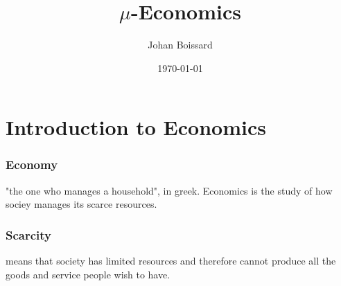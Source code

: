\documentclass[a4paper,titlepage] {scrartcl}
\author{Johan Boissard}
\date{\today}
\title{$\mu$-Economics}
\begin{document}
\maketitle

\section{Introduction to Economics}
\subsubsection{Economy} "the one who manages a household", in greek. Economics is the study of how sociey manages its scarce resources.

\subsubsection{Scarcity}
means that society has limited resources and therefore cannot produce all the goods and service people wish to have.
\end{document}
